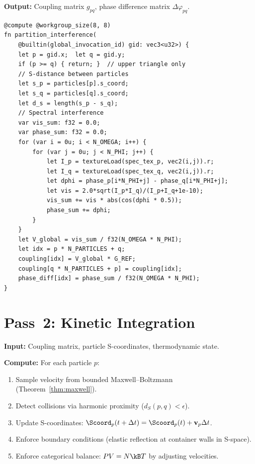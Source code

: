 \textbf{Output:} Coupling matrix $g_{pq}$, phase difference matrix $\Delta\varphi_{pq}$.

\begin{lstlisting}[style=wgsl,caption={Pass 1: Partition Interference (WGSL pseudocode)}]
@compute @workgroup_size(8, 8)
fn partition_interference(
    @builtin(global_invocation_id) gid: vec3<u32>) {
    let p = gid.x;  let q = gid.y;
    if (p >= q) { return; }  // upper triangle only
    // S-distance between particles
    let s_p = particles[p].s_coord;
    let s_q = particles[q].s_coord;
    let d_s = length(s_p - s_q);
    // Spectral interference
    var vis_sum: f32 = 0.0;
    var phase_sum: f32 = 0.0;
    for (var i = 0u; i < N_OMEGA; i++) {
        for (var j = 0u; j < N_PHI; j++) {
            let I_p = textureLoad(spec_tex_p, vec2(i,j)).r;
            let I_q = textureLoad(spec_tex_q, vec2(i,j)).r;
            let dphi = phase_p[i*N_PHI+j] - phase_q[i*N_PHI+j];
            let vis = 2.0*sqrt(I_p*I_q)/(I_p+I_q+1e-10);
            vis_sum += vis * abs(cos(dphi * 0.5));
            phase_sum += dphi;
        }
    }
    let V_global = vis_sum / f32(N_OMEGA * N_PHI);
    let idx = p * N_PARTICLES + q;
    coupling[idx] = V_global * G_REF;
    coupling[q * N_PARTICLES + p] = coupling[idx];
    phase_diff[idx] = phase_sum / f32(N_OMEGA * N_PHI);
}
\end{lstlisting}

\section{Pass~2: Kinetic Integration}
\label{sec:pass2}

\textbf{Input:} Coupling matrix, particle S-coordinates, thermodynamic state.

\textbf{Compute:} For each particle $p$:
\begin{enumerate}
    \item Sample velocity from bounded Maxwell--Boltzmann (Theorem~\ref{thm:maxwell}).
    \item Detect collisions via harmonic proximity ($d_S(p, q) < \epsilon$).
    \item Update S-coordinates: $\Scoord_p(t + \Delta t) = \Scoord_p(t) + \mathbf{v}_p \Delta t$.
    \item Enforce boundary conditions (elastic reflection at container walls in S-space).
    \item Enforce categorical balance: $PV = N\kB T$ by adjusting velocities.
\end{enumerate}

